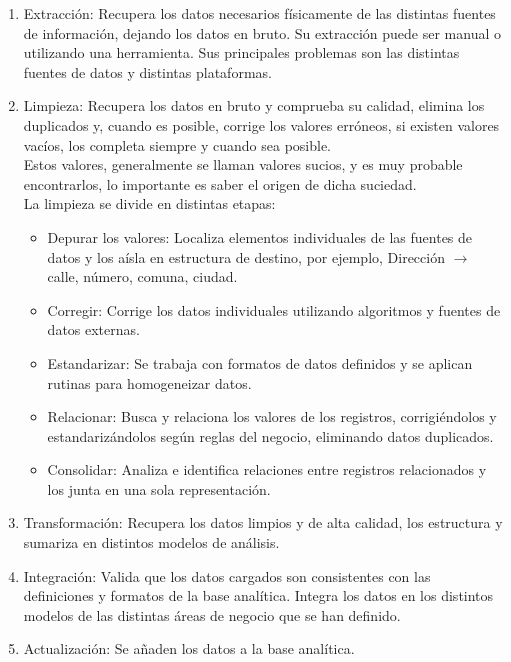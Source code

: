 \begin{enumerate}
\item Extracción:
Recupera los datos necesarios físicamente de las distintas fuentes de información, dejando los datos en bruto. Su extracción puede ser manual o utilizando una herramienta. Sus principales problemas son las distintas fuentes de datos y distintas plataformas.

\item Limpieza:
Recupera los datos en bruto y comprueba su calidad, elimina los duplicados y, cuando es posible, corrige los valores erróneos, si existen valores vacíos, los completa siempre y cuando sea posible.\\

Estos valores, generalmente se llaman valores sucios, y es muy probable encontrarlos, lo importante es saber el origen de dicha suciedad.\\

La limpieza se divide en distintas etapas:
\begin{itemize}
    \item Depurar los valores:
    Localiza elementos individuales de las fuentes de datos y los aísla en estructura de destino, por ejemplo, Dirección $\rightarrow $ calle, número, comuna, ciudad.
    
    \item Corregir:
    Corrige los datos individuales utilizando algoritmos y fuentes de datos externas.
    
    \item Estandarizar:
    Se trabaja con formatos de datos definidos y se aplican rutinas para homogeneizar datos. 
    
    \item Relacionar:
    Busca y relaciona los valores de los registros, corrigiéndolos y estandarizándolos según reglas del negocio, eliminando datos duplicados.
    
    \item Consolidar: 
    Analiza e identifica relaciones entre registros relacionados y los junta en una sola representación.

\end{itemize}

\item Transformación:
Recupera los datos limpios y de alta calidad, los estructura y sumariza en distintos modelos de análisis.

\item Integración:
Valida que los datos cargados son consistentes con las definiciones y formatos de la base analítica. Integra los datos en los distintos modelos de las distintas áreas de negocio que se han definido.

\item Actualización:
Se añaden los datos a la base analítica.

\end{enumerate}


